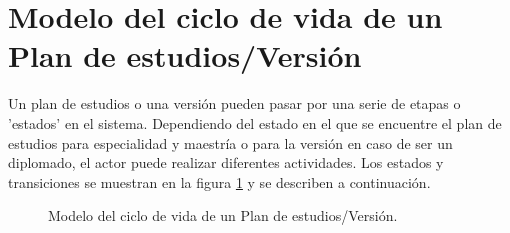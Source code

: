 %	
%


\hypertarget{cv:Version}{\section{Modelo del ciclo de vida de un Plan de estudios/Versión} }

Un plan de estudios o una versión pueden pasar por una serie de etapas o 'estados' en el sistema. Dependiendo del estado en el que se encuentre el plan de estudios para especialidad y maestría o para la versión en caso de ser un diplomado, el actor puede realizar diferentes actividades. Los estados y transiciones se muestran en la figura \ref{fig:MEdeVersion} y se describen a continuación.

\begin{figure}[htbp!]
	\centering
	\caption{Modelo del ciclo de vida de un Plan de estudios/Versión.}
	\label{fig:MEdeVersion}
\end{figure}

